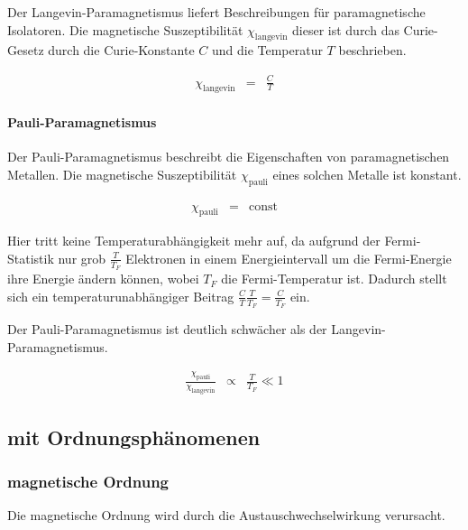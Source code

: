 \documentclass[12pt,a4paper]{scrartcl}
\numberwithin{equation}{section} %
\begin{document}
Der Langevin-Paramagnetismus liefert Beschreibungen für paramagnetische
Isolatoren. Die magnetische Suszeptibilität $\chi_\mathrm{langevin}$
dieser ist durch das Curie-Gesetz durch die Curie-Konstante $C$ und
die Temperatur $T$ beschrieben.

\begin{eqnarray}
    \chi_\mathrm{langevin} &=& \frac{C}{T}
\end{eqnarray}

\hypertarget{pauli-paramagnetismus}{%
\paragraph{Pauli-Paramagnetismus}\label{pauli-paramagnetismus}}

Der Pauli-Paramagnetismus beschreibt die Eigenschaften von
paramagnetischen Metallen. Die magnetische Suszeptibilität
$\chi_\mathrm{pauli}$ eines solchen Metalle ist konstant.

\begin{eqnarray}
    \chi_\mathrm{pauli} &=& \mathrm{const}
\end{eqnarray}

Hier tritt keine Temperaturabhängigkeit mehr auf, da aufgrund der
Fermi-Statistik nur grob $\frac{T}{T_F}$ Elektronen in einem
Energieintervall um die Fermi-Energie ihre Energie ändern können, wobei
$T_F$ die Fermi-Temperatur ist. Dadurch stellt sich ein
temperaturunabhängiger Beitrag
$\frac{C}{T} \frac{T}{T_F} = \frac{C}{T_F}$ ein.

Der Pauli-Paramagnetismus ist deutlich schwächer als der
Langevin-Paramagnetismus.

\begin{eqnarray}
    \frac{\chi_\mathrm{pauli}}{\chi_\mathrm{langevin}}
        &\propto& \frac{T}{T_F} \ll 1
\end{eqnarray}

\hypertarget{mit-ordnungsphuxe4nomenen}{%
\subsection{mit Ordnungsphänomenen}\label{mit-ordnungsphuxe4nomenen}}

\hypertarget{magnetische-ordnung}{%
\subsubsection{magnetische Ordnung}\label{magnetische-ordnung}}

Die magnetische Ordnung wird durch die Austauschwechselwirkung
verursacht.
\end{document}

